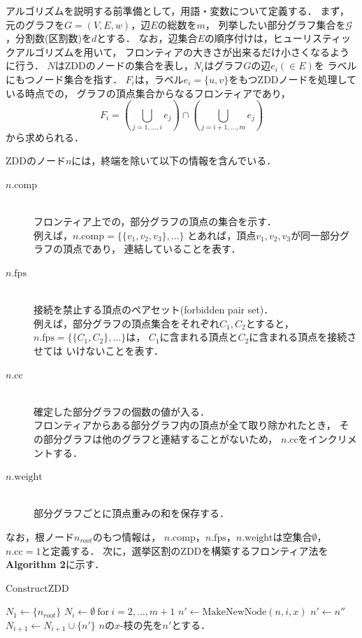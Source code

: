 アルゴリズムを説明する前準備として，用語・変数について定義する．
まず，元のグラフを$G=(V,E,w)$，辺$E$の総数を$m$，
列挙したい部分グラフ集合を$\mathcal{G}$，分割数(区割数)を$d$とする．
なお，辺集合$E$の順序付けは，ヒューリスティックアルゴリズムを用いて，
フロンティアの大きさが出来るだけ小さくなるように行う．
$N$はZDDのノードの集合を表し，$N_i$はグラフ$G$の辺$e_i (\in E)$を
ラベルにもつノード集合を指す．
$F_i$は，ラベル$e_i=\{u,v\}$をもつZDDノードを処理している時点での，
グラフの頂点集合からなるフロンティアであり，
$$ F_i=(\bigcup_{j=1,\ldots ,i}e_j)\cap (\bigcup_{j=i+1, \ldots, m} e_j) $$
から求められる．

ZDDのノード$n$には，終端を除いて以下の情報を含んでいる．

\begin{description}
  \item[$n.\mathrm{comp}$]\mbox{}\\
    フロンティア上での，部分グラフの頂点の集合を示す．\\
    例えば，$n.\mathrm{comp}=\{\{v_1,v_2,v_3\},\ldots\}$
    とあれば，頂点$v_1,v_2,v_3$が同一部分グラフの頂点であり，
    連結していることを表す．
  \item[$n.\mathrm{fps}$ ]\mbox{}\\
    接続を禁止する頂点のペアセット(forbidden pair set)．\\
    例えば，部分グラフの頂点集合をそれぞれ$C_1,C_2$とすると，
    $n.\mathrm{fps}=\{\{C_1,C_2\},\ldots\}$は，
    $C_1$に含まれる頂点と$C_2$に含まれる頂点を接続させては
    いけないことを表す．
  \item[$n.\mathrm{cc}$]\mbox{}\\
    確定した部分グラフの個数の値が入る．\\
    フロンティアからある部分グラフ内の頂点が全て取り除かれたとき，
    その部分グラフは他のグラフと連結することがないため，
    $n.\mathrm{cc}$をインクリメントする．
  \item[$n.\mathrm{weight}$]\mbox{}\\
    部分グラフごとに頂点重みの和を保存する．
\end{description}

なお，根ノード$n_{root}$のもつ情報は，
$n.\mathrm{comp}$，$n.\mathrm{fps}，n.\mathrm{weight}$は空集合$\emptyset$，
$n.\mathrm{cc}=1$と定義する．
次に，選挙区割のZDDを構築するフロンティア法を\textbf{Algorithm 2}に示す．

\begin{algorithm}
  \caption{ConstructZDD}
  \label{construct_zdd}
  \begin{algorithmic}[1]
    \State $N_1 \gets \{n_{root}\}$
    \State $N_i \gets \emptyset~\mathrm{for}~i=2, \ldots ,m+1$
          \State $n' \gets \mathrm{MakeNewNode}(n,i,x)$
              \State $n' \gets n''$
            \Else
              \State $N_{i+1} \gets N_{i+1} \cup \{n'\}$
            \EndIf
          \EndIf
          \State $n$の$x$-枝の先を$n'$とする．
        \EndFor
      \EndFor
    \EndFor
  \end{algorithmic}
\end{algorithm}

